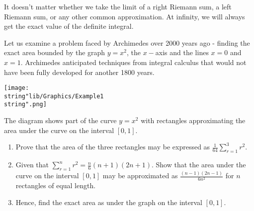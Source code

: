 \documentclass[11pt,a4paper]{book}
\begin{document}
\vspace{1cm}

It doesn't matter whether we take the limit of a right Riemann sum,
a left Riemann sum, or any other common approximation. At infinity,
we will always get the exact value of the definite integral.

\newpage{}

\begin{example}

\begin{minipage}[t]{.5\textwidth}

Let us examine a problem faced by Archimedes over 2000 years ago -
finding the exact area bounded by the graph $y=x^{2}$, the $x-$axis
and the lines $x=0$ and $x=1$. Archimedes anticipated techniques
from integral calculus that would not have been fully developed for
another 1800 years.

\end{minipage}
\begin{minipage}[t]{.5\textwidth}

\begin{center}
\texttt{[image: \\string"lib/Graphics/Example1\\string".png]}
\par\end{center}

\end{minipage}

The diagram shows part of the curve $y=x^{2}$ with rectangles approximating the area under the curve on the interval $[0,1]$.

\begin{enumerate}[label=(\alph*)]

\item  Prove that the area of the three rectangles may be expressed
as ${\displaystyle \frac{1}{64}\sum_{r=1}^{3}r^{2}}$.

\item  Given that ${\displaystyle \sum_{r=1}^{n}r^{2}=\frac{n}{6}(n+1)(2n+1)}$.
Show that the area under the curve on the interval $[0,1]$ may be
approximated as ${\displaystyle \frac{(n-1)(2n-1)}{6n^{2}}}$ for
$n$ rectangles of equal length.

\item  Hence, find the exact area as under the graph on the interval
$[0,1]$.

\end{enumerate}

\Solution


\end{example}
\end{document}
